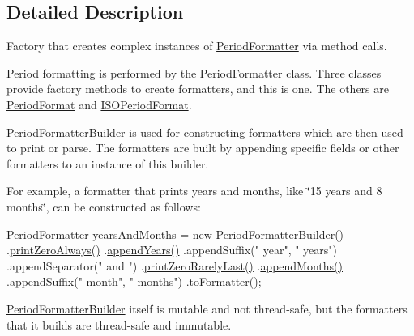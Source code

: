 \subsection{Detailed Description}
Factory that creates complex instances of \hyperlink{classorg_1_1joda_1_1time_1_1format_1_1_period_formatter}{Period\-Formatter} via method calls. 

\hyperlink{classorg_1_1joda_1_1time_1_1_period}{Period} formatting is performed by the \hyperlink{classorg_1_1joda_1_1time_1_1format_1_1_period_formatter}{Period\-Formatter} class. Three classes provide factory methods to create formatters, and this is one. The others are \hyperlink{classorg_1_1joda_1_1time_1_1format_1_1_period_format}{Period\-Format} and \hyperlink{classorg_1_1joda_1_1time_1_1format_1_1_i_s_o_period_format}{I\-S\-O\-Period\-Format}. 

\hyperlink{classorg_1_1joda_1_1time_1_1format_1_1_period_formatter_builder}{Period\-Formatter\-Builder} is used for constructing formatters which are then used to print or parse. The formatters are built by appending specific fields or other formatters to an instance of this builder. 

For example, a formatter that prints years and months, like \char`\"{}15 years and 8 months\char`\"{}, can be constructed as follows\-: 


\begin{DoxyPre}
\hyperlink{classorg_1_1joda_1_1time_1_1format_1_1_period_formatter}{PeriodFormatter} yearsAndMonths = new PeriodFormatterBuilder()
    .\hyperlink{classorg_1_1joda_1_1time_1_1format_1_1_period_formatter_builder_a84ee2686fc1f658df23d9c44daa9a334}{printZeroAlways()}
    .\hyperlink{classorg_1_1joda_1_1time_1_1format_1_1_period_formatter_builder_a467b0bb6eebb620938365d197458f1c5}{appendYears()}
    .appendSuffix(" year", " years")
    .appendSeparator(" and ")
    .\hyperlink{classorg_1_1joda_1_1time_1_1format_1_1_period_formatter_builder_a92a932fc52e05d0114c52cc454b2d29c}{printZeroRarelyLast()}
    .\hyperlink{classorg_1_1joda_1_1time_1_1format_1_1_period_formatter_builder_a10d45df75c1efda493d558f75d8327e0}{appendMonths()}
    .appendSuffix(" month", " months")
    .\hyperlink{classorg_1_1joda_1_1time_1_1format_1_1_period_formatter_builder_af75c55ab98105a6102496c8efae19415}{toFormatter()};
\end{DoxyPre}
 

\hyperlink{classorg_1_1joda_1_1time_1_1format_1_1_period_formatter_builder}{Period\-Formatter\-Builder} itself is mutable and not thread-\/safe, but the formatters that it builds are thread-\/safe and immutable.

